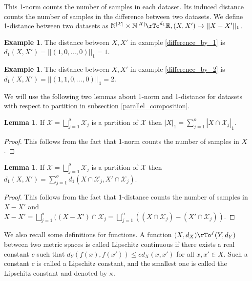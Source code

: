 \documentclass[12pt]{amsart}
\theoremstyle{definition}
\newtheorem{example}[theorem]{Example}
\newtheorem{lemma}[theorem]{Lemma}
\begin{document}
This 1-norm counts the number of samples in each dataset. Its induced distance counts the number of samples in the difference between two datasets.
\dfn \label{1_distance} We define 1-distance between two datasets as $\mathbb{N}^{|\mathcal{X}|} \times \mathbb{N}^{|\mathcal{X}|} \rTo^{d_1} \mathbb{R}, (X, X') \mapsto ||X - X'||_1$.

\begin{example} \label{distance_by_1} The distance between $X, X'$ in example \ref{difference_by_1} is $d_1(X, X') = ||(1, 0, \dots , 0)||_1 = 1$.
\end{example}

\begin{example} \label{distance_by_2} The distance between $X, X'$ in example \ref{difference_by_2} is $d_1(X, X') = ||(1, 1, 0, \dots , 0)||_1 = 2$.
\end{example}

We will use the following two lemmas about 1-norm and 1-distance for datasets with respect to partition in subsection \ref{parallel_composition}.

\begin{lemma} \label{norm_partition} If $\mathcal{X} = \bigsqcup\limits_{j = 1}^o \mathcal{X}_j$ is a partition of $\mathcal{X}$ then $|X|_1 = \sum\limits_{j = 1}^o |X \cap \mathcal{X}_j|_1$.
\end{lemma}
\begin{proof} This follows from the fact that 1-norm counts the number of samples in $X$.
\end{proof}

\begin{lemma} \label{distance_partition} If $\mathcal{X} = \bigsqcup\limits_{j = 1}^o \mathcal{X}_j$ is a partition of $\mathcal{X}$ then $d_1(X, X') = \sum\limits_{j = 1}^o d_1(X \cap \mathcal{X}_j, X' \cap \mathcal{X}_j)$.
\end{lemma}
\begin{proof} This follows from the fact that 1-distance counts the number of samples in $X - X'$ and $X - X' = \bigsqcup\limits_{j = 1}^o ((X - X') \cap \mathcal{X}_j = \bigsqcup\limits_{j = 1}^o ((X \cap \mathcal{X}_j) - (X' \cap \mathcal{X}_j))$.
\end{proof}

We also recall some definitions for functions.
\dfn \label{Lipschitz_function} A function $(X, d_X) \rTo^f (Y, d_Y)$ between two metric spaces is called Lipschitz continuous if there exists a real constant $c$ such that $d_Y(f(x), f(x')) \leq c d_X(x, x')$ for all $x, x' \in X$. Such a constant $c$ is called a Lipschitz constant, and the smallest one is called the Lipschitz constant and denoted by $\kappa$.
\end{document}
